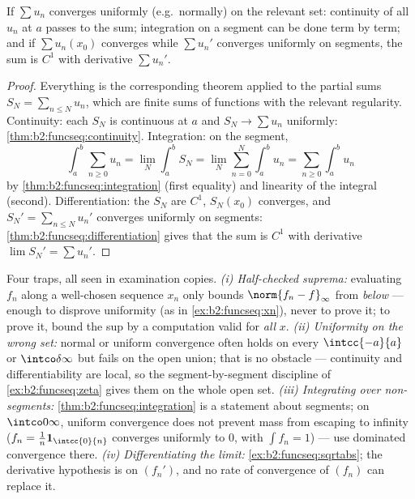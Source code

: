 \begin{theorem}\label{thm:b2:funcseq:seriestransfer}
If $\sum u_n$ converges uniformly (e.g.\ normally) on the relevant
set: continuity of all $u_n$ at $a$ passes to the sum; integration
on a segment can be done term by term; and if $\sum u_n(x_0)$
converges while $\sum u_n'$ converges uniformly on segments, the
sum is $C^1$ with derivative $\sum u_n'$.
\end{theorem}

\begin{proof}
Everything is the corresponding theorem applied to the partial
sums $S_N = \sum_{n\leq N}u_n$, which are finite sums of
functions with the relevant regularity. Continuity: each $S_N$
is continuous at $a$ and $S_N \to \sum u_n$ uniformly:
\cref{thm:b2:funcseq:continuity}. Integration: on the segment,
\[
\int_a^b \sum_{n\geq0} u_n
= \lim_N \int_a^b S_N
= \lim_N \sum_{n=0}^{N}\int_a^b u_n
= \sum_{n\geq0}\int_a^b u_n
\]
by \cref{thm:b2:funcseq:integration} (first equality) and
linearity of the integral (second). Differentiation: the
$S_N$ are $C^1$, $S_N(x_0)$ converges, and $S_N' =
\sum_{n\leq N}u_n'$ converges uniformly on segments:
\cref{thm:b2:funcseq:differentiation} gives that the sum is
$C^1$ with derivative $\lim S_N' = \sum u_n'$.
\end{proof}

\begin{remark}
Four traps, all seen in examination copies. \emph{(i)
Half-checked suprema:} evaluating $f_n$ along a well-chosen
sequence $x_n$ only bounds $\norm{f_n - f}_\infty$ from
\emph{below} --- enough to disprove uniformity (as in
\cref{ex:b2:funcseq:xn}), never to prove it; to prove it, bound
the sup by a computation valid for \emph{all} $x$. \emph{(ii)
Uniformity on the wrong set:} normal or uniform convergence
often holds on every $\intcc{-a}{a}$ or $\intco\delta\infty$
but fails on the open union; that is no obstacle --- continuity
and differentiability are local, so the segment-by-segment
discipline of \cref{ex:b2:funcseq:zeta} gives them on the whole
open set. \emph{(iii) Integrating over non-segments:}
\cref{thm:b2:funcseq:integration} is a statement about
segments; on $\intco0\infty$, uniform convergence does not
prevent mass from escaping to infinity ($f_n =
\frac1n\mathbf 1_{\intcc{0}{n}}$ converges uniformly to $0$,
with $\int f_n = 1$) --- use dominated convergence there.
\emph{(iv) Differentiating the limit:}
\cref{ex:b2:funcseq:sqrtabs}; the derivative hypothesis is on
$(f_n')$, and no rate of convergence of $(f_n)$ can replace
it.
\end{remark}

